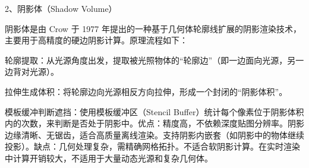 \begin{Shaded}
\begin{Highlighting}[]


\OperatorTok{=} \NormalTok{()}\OperatorTok{;}

 \OperatorTok{=} \OperatorTok{;}

\OperatorTok{=} \NormalTok{(}\OperatorTok{,} \NormalTok{)}\OperatorTok{;}

 \OperatorTok{=} \OperatorTok{;}

\OperatorTok{;}

\OperatorTok{=} \OperatorTok{,}\OperatorTok{;}

 \OperatorTok{=} \OperatorTok{;}

\OperatorTok{=} \OperatorTok{,}\OperatorTok{;}

 \OperatorTok{=} \OperatorTok{;}

\OperatorTok{;}
\end{Highlighting}
\end{Shaded}

2、阴影体（Shadow Volume）

阴影体是由 Crow 于 1977 年提出的一种基于几何体轮廓线扩展的阴影渲染技术，主要用于高精度的硬边阴影计算。原理流程如下：

轮廓提取：从光源角度出发，提取被光照物体的``轮廓边''（即一边面向光源，另一边背对光源）。

拉伸生成体积：将轮廓边向光源相反方向拉伸，形成一个封闭的``阴影体积''。

模板缓冲判断遮挡：使用模板缓冲区（Stencil Buffer）统计每个像素位于阴影体积内的次数，来判断是否处于阴影中。优点：精度高，不依赖深度贴图分辨率。阴影边缘清晰、无锯齿，适合高质量离线渲染。支持阴影内嵌套（如阴影中的物体继续投影）。缺点：几何处理复杂，需精确网格拓扑。不适合软阴影计算。在实时渲染中计算开销较大，不适用于大量动态光源和复杂几何体。

